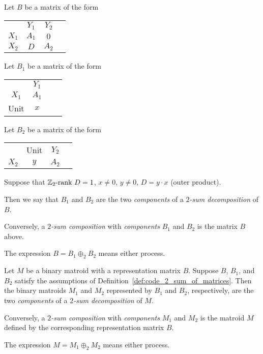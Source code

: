 \begin{definition}
  \label{def:code_2_sum_of_matrices}
  \leanok
  Let $B$ be a matrix of the form
  \begin{tabular}{cccc}
                                 & $Y_{1}$                      & $Y_{2}$                      \\ \cline{2-3}
    \multicolumn{1}{c|}{$X_{1}$} & \multicolumn{1}{c|}{$A_{1}$} & \multicolumn{1}{c|}{    $0$} \\ \cline{2-3}
    \multicolumn{1}{c|}{$X_{2}$} & \multicolumn{1}{c|}{    $D$} & \multicolumn{1}{c|}{$A_{2}$} \\ \cline{2-3}
  \end{tabular}
  Let $B_{1}$ be a matrix of the form
  \begin{tabular}{cccc}
                                 & $Y_{1}$ \\ \cline{2-3}
    \multicolumn{1}{c|}{$X_{1}$} & \multicolumn{1}{c|}{$A_{1}$} \\ \cline{2-3}
    \multicolumn{1}{c|}{   Unit} & \multicolumn{1}{c|}{    $x$} \\ \cline{2-3}
  \end{tabular}
  Let $B_{2}$ be a matrix of the form
  \begin{tabular}{cccc}
                                 &                     Unit & $Y_{2}$ \\ \cline{2-3}
    \multicolumn{1}{c|}{$X_{2}$} & \multicolumn{1}{c|}{$y$} & \multicolumn{1}{c|}{$A_{2}$} \\ \cline{2-3}
  \end{tabular}
  Suppose that $\mathbb{Z}_2 \text{-rank } D = 1$, $x \neq 0$, $y \neq 0$, $D = y \cdot x$ (outer product).

  Then we say that $B_{1}$ and $B_{2}$ are the two \emph{components} of a \emph{$2$-sum decomposition} of $B$.

  Conversely, a \emph{$2$-sum composition} with \emph{components} $B_{1}$ and $B_{2}$ is the matrix $B$ above.

  The expression $B = B_{1} \oplus_{2} B_{2}$ means either process.
\end{definition}

\begin{definition}
  \label{def:code_2_sum_of_binary}
  \leanok
  Let $M$ be a binary matroid with a representation matrix $B$.
  Suppose $B$, $B_{1}$, and $B_{2}$ satisfy the assumptions of Definition~\ref{def:code_2_sum_of_matrices}.
  Then the binary matroids $M_{1}$ and $M_{2}$ represented by $B_{1}$ and $B_{2}$, respectively, are the two \emph{components} of a \emph{$2$-sum decomposition} of $M$.

  Conversely, a \emph{$2$-sum composition} with \emph{components} $M_{1}$ and $M_{2}$ is the matroid $M$ defined by the corresponding representation matrix $B$.

  The expression $M = M_{1} \oplus_{2} M_{2}$ means either process.
\end{definition}

